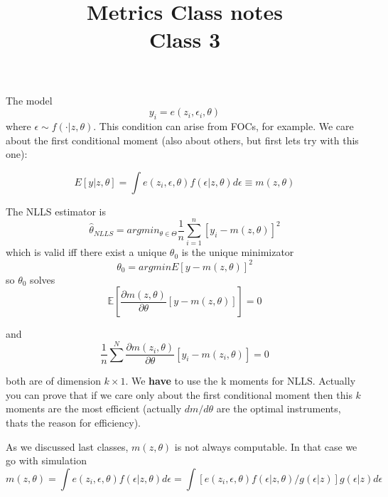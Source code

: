 \documentclass[12pt]{article}
\title{\Large{\textbf{Metrics Class notes}} \\
Class 3}
\begin{document}
\maketitle

The model 
\begin{equation*}
	y_i = e(z_i, \epsilon_i, \theta)
\end{equation*}
where $\epsilon \sim f(\cdot | z, \theta)$. This condition can arise from FOCs, for example. We care about the first conditional moment (also about others, but first lets try with this one): 

\begin{equation*}
	E[y | z, \theta] = \int e(z_i, \epsilon, \theta) f(\epsilon | z, \theta) d \epsilon \equiv m(z,\theta)
\end{equation*}

The NLLS estimator is
\begin{equation*}
	\hat{\theta}_{NLLS} = argmin_{\theta \in \Theta} \frac{1}{n} \sum^n_{i=1} [y_i - m(z, \theta)]^2
\end{equation*}
which is valid iff there exist a unique $\theta_0$ is the unique minimizator
\begin{equation}
	\theta_0 = argmin E[y-m(z,\theta)]^2
\end{equation}
so $\theta_0$ solves 
\begin{equation*}
	\mathbb{E} \left[ \frac{\partial m(z,\theta)}{\partial \theta} [y - m(z, \theta)]\right] = 0 
\end{equation*}

and 
\begin{equation*}
	\frac{1}{n} \sum^N \frac{\partial m(z_i,\theta)}{\partial \theta} [y_i - m(z_i, \theta)] = 0 
\end{equation*}

both are of dimension $k \times 1$. We \textbf{have} to use the k moments for NLLS. Actually you can prove that if we care only about the first conditional moment then this $k$ moments are the most efficient (actually $dm/d\theta$ are the optimal instruments, thats the reason for efficiency). 

As we discussed last classes, $m(z,\theta)$ is not always computable. In that case we go with simulation
\begin{equation*}
	m(z,\theta) = \int e(z_i, \epsilon, \theta) f(\epsilon | z, \theta) d \epsilon = \int [e(z_i, \epsilon, \theta) f(\epsilon | z, \theta)/g(\epsilon | z) ] g(\epsilon | z) d \epsilon
\end{equation*}
\end{document}
